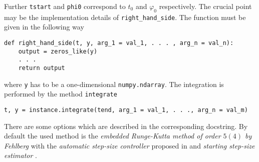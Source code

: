 Further \texttt{tstart} and \texttt{phi0} correspond to $t_0$ and $\varphi_0$ respectively. The crucial point may be the implementation details of \texttt{right\_hand\_side}. The function must be given in the following way

\begin{verbatim}
def right_hand_side(t, y, arg_1 = val_1, . . . , arg_n = val_n):
	output = zeros_like(y)
	. . .
	return output
\end{verbatim}

where \texttt{y} has to be a one-dimensional \texttt{numpy.ndarray}. The integration is performed by the method \texttt{integrate} 

\begin{verbatim}
t, y = instance.integrate(tend, arg_1 = val_1, . . ., arg_n = val_m)
\end{verbatim}

There are some options which are described in the corresponding docstring. By default the used method is the \emph{embedded Runge-Kutta method of order $5(4)$ by Fehlberg} \cite[177]{ODE_I_HAIRER} with the \emph{automatic step-size controller} proposed in \cite[167--168]{ODE_I_HAIRER} and \emph{starting step-size estimator} \cite[169]{ODE_I_HAIRER}.

